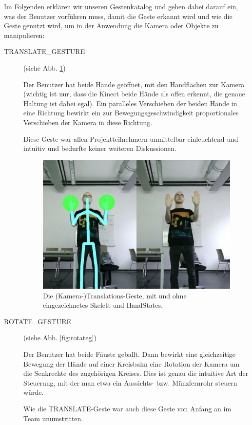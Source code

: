 	Im Folgenden erklären wir unseren Gestenkatalog und gehen dabei darauf ein, was der Benutzer vorführen muss, damit die Geste erkannt wird und wie die Geste genutzt wird, um in der Anwendung die Kamera oder Objekte zu manipulieren:\par\bigskip
	\begin{description}
		\item[TRANSLATE\_GESTURE] (siehe Abb. \ref{fig:translateg})\par
		Der Benutzer hat beide Hände geöffnet, mit den Handflächen zur Kamera (wichtig ist nur, dass die Kinect beide Hände als offen erkennt, die genaue Haltung ist dabei egal). Ein paralleles Verschieben der beiden Hände in eine Richtung bewirkt ein zur Bewegungsgeschwindigkeit proportionales Verschieben der Kamera in diese Richtung.\par 
		Diese Geste war allen Projektteilnehmern unmittelbar einleuchtend und intuitiv und bedurfte keiner weiteren Diskussionen. 
		\begin{figure}[h!]
		\centering
		\includegraphics[width=.8\textwidth]{pictures/translate_.png}
		\caption{Die (Kamera-)Translations-Geste, mit und ohne eingezeichnetes Skelett und HandStates.}\label{fig:translateg}
		\end{figure}
		\par
		\item[ROTATE\_GESTURE] (siehe Abb. \ref{fig:rotateg})\par
		Der Benutzer hat beide Fäuste geballt. Dann bewirkt eine gleichzeitige Bewegung der Hände auf einer Kreisbahn eine Rotation der Kamera um die Senkrechte des zugehörigen Kreises. Dies ist genau die intuitive Art der Steuerung, mit der man etwa ein Aussichts- bzw. Münzfernrohr steuern würde.\par
		Wie die TRANSLATE-Geste war auch diese Geste von Anfang an im Team unumstritten.

\end{description}

